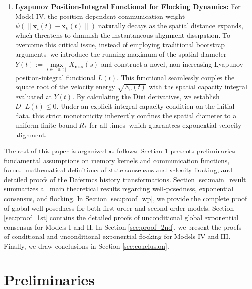 \documentclass[11pt]{amsart}
\numberwithin{equation}{section}
\begin{document}
\begin{enumerate}
    \item [(iii)] \textbf{Lyapunov Position-Integral Functional for Flocking Dynamics:} For Model IV, the position-dependent communication weight $\psi(\|\boldsymbol{x}_i(t)-\boldsymbol{x}_k(t)\|)$ naturally decays as the spatial distance expands, which threatens to diminish the instantaneous alignment dissipation. To overcome this critical issue, instead of employing traditional bootstrap arguments, we introduce the running maximum of the spatial diameter $Y(t) := \max\limits_{s \in [0,t]} X_{\max}(s)$ and construct a novel, non-increasing Lyapunov position-integral functional $L(t)$. This functional seamlessly couples the square root of the velocity energy $\sqrt{E_v(t)}$ with the spatial capacity integral evaluated at $Y(t)$. By calculating the Dini derivatives, we establish $D^+ L(t) \le 0$. Under an explicit integral capacity condition on the initial data, this strict monotonicity inherently confines the spatial diameter to a uniform finite bound $R_*$ for all times, which guarantees exponential velocity alignment.
\end{enumerate}

The rest of this paper is organized as follows. Section \ref{sec:pre} presents preliminaries, fundamental assumptions on memory kernels and communication functions, formal mathematical definitions of state consensus and velocity flocking, and detailed proofs of the Dafermos history transformations. Section \ref{sec:main_result} summarizes all main theoretical results regarding well-posedness, exponential consensus, and flocking. In Section \ref{sec:proof_wp}, we provide the complete proof of global well-posedness for both first-order and second-order models. Section \ref{sec:proof_1st} contains the detailed proofs of unconditional global exponential consensus for Models I and II. In Section \ref{sec:proof_2nd}, we present the proofs of conditional and unconditional exponential flocking for Models IV and III. Finally, we draw conclusions in Section \ref{sec:conclusion}.


\section{Preliminaries}\label{sec:pre}
\end{document}
